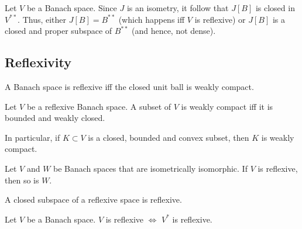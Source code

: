 \documentclass[12pt]{article}	%
\begin{document}
\begin{rem}
	Let $V$ be a Banach space. Since $J$ is an isometry, it follow that $J[B]$ is closed in $V^{\ast \ast}$. Thus, either $J[B] = B^{\ast \ast}$ (which happens iff $V$ is reflexive) or $J[B]$ is a closed and proper subspace of $B^{\ast \ast}$ (and hence, not dense).
\end{rem}

\subsection{Reflexivity}

\begin{thm}
	A Banach space is reflexive iff the closed unit ball is weakly compact.
\end{thm}

\begin{cor}
	Let $V$ be a reflexive Banach space. A subset of $V$ is weakly compact iff it is bounded and weakly closed.

	In particular, if $K \subset V$ is a closed, bounded and convex subset, then $K$ is weakly compact.
\end{cor}

\begin{cor}
	Let $V$ and $W$ be Banach spaces that are isometrically isomorphic. If $V$ is reflexive, then so is $W$.
\end{cor}

\begin{cor}
	A closed subspace of a reflexive space is reflexive.
\end{cor}

\begin{cor}
	Let $V$ be a Banach space. $V$ is reflexive $\Leftrightarrow$ $V^{\ast}$ is reflexive.
\end{cor}
\end{document}
